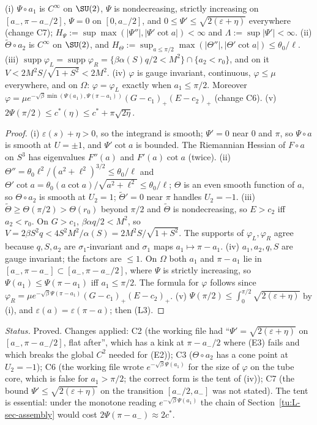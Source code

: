 \begin{lemma}\label{tu:L-ansatz-props}
(i) $\Psi\circ a_1$ is $C^\infty$ on $\SU(2)$, $\Psi$ is nondecreasing, strictly increasing on
$[a_-,\pi-a_-/2]$, $\Psi=0$ on $[0,a_-/2]$, and $0\le\Psi'\le\sqrt{2(\varepsilon+\eta)}$ everywhere
(change C7); $H_\Psi:=\sup\max(|\Psi''|,|\Psi'\cot a|)<\infty$ and $\Lambda:=\sup|\Psi'|<\infty$.
(ii) $\tilde\Theta\circ a_2$ is $C^\infty$ on $\SU(2)$, and $H_\Theta:=\sup_{a\le\pi/2}\max(|\Theta''|,|\Theta'\cot a|)\le\theta_0/\ell$.
(iii) $\operatorname{supp}\varphi_L=\operatorname{supp}\varphi_R=\{\beta\alpha(S)q/2<M^2\}\cap\{a_2<r_0\}$,
and on it $V<2M^2S/\sqrt{1+S^2}<2M^2$.
(iv) $\varphi$ is gauge invariant, continuous, $\varphi\le\mu$ everywhere, and on $\Omega$:
$\varphi=\varphi_L$ exactly when $a_1\le\pi/2$. Moreover
$\varphi=\mu e^{-\sqrt\beta\min(\Psi(a_1),\Psi(\pi-a_1))}(G-c_1)_+(E-c_2)_+$ (change C6).
(v) $2\Psi(\pi/2)\le c^*(\eta)\le c^*+\pi\sqrt{2\eta}$.
\end{lemma}

\begin{proof}
(i) $\varepsilon(s)+\eta>0$, so the integrand is smooth; $\Psi'=0$ near $0$ and $\pi$, so $\Psi\circ a$
is smooth at $U=\pm1$, and $\Psi'\cot a$ is bounded. The Riemannian Hessian of $F\circ a$ on $S^3$ has
eigenvalues $F''(a)$ and $F'(a)\cot a$ (twice). (ii) $\Theta''=\theta_0\ell^2/(a^2+\ell^2)^{3/2}\le\theta_0/\ell$
and $\Theta'\cot a=\theta_0(a\cot a)/\sqrt{a^2+\ell^2}\le\theta_0/\ell$; $\Theta$ is an even smooth function of $a$, so
$\Theta\circ a_2$ is smooth at $U_2=1$; $\tilde\Theta'=0$ near $\pi$ handles $U_2=-1$.
(iii) $\tilde\Theta\ge\Theta(\pi/2)>\Theta(r_0)$ beyond $\pi/2$ and $\tilde\Theta$ is nondecreasing, so
$E>c_2$ iff $a_2<r_0$. On $G>c_1$, $\beta\alpha q/2<M^2$, so
$V=2\beta S^2q<4S^2M^2/\alpha(S)=2M^2S/\sqrt{1+S^2}$. The supports of $\varphi_L,\varphi_R$ agree
because $q,S,a_2$ are $\sigma_1$-invariant and $\sigma_1$ maps $a_1\mapsto\pi-a_1$.
(iv) $a_1,a_2,q,S$ are gauge invariant; the factors are $\le1$. On $\Omega$ both $a_1$ and $\pi-a_1$
lie in $[a_-,\pi-a_-]\subset[a_-,\pi-a_-/2]$, where $\Psi$ is strictly increasing, so
$\Psi(a_1)\le\Psi(\pi-a_1)$ iff $a_1\le\pi/2$. The formula for $\varphi$ follows since
$\varphi_R=\mu e^{-\sqrt\beta\Psi(\pi-a_1)}(G-c_1)_+(E-c_2)_+$.
(v) $\Psi(\pi/2)\le\int_0^{\pi/2}\sqrt{2(\varepsilon+\eta)}$ by (i), and $\varepsilon(a)=\varepsilon(\pi-a)$;
then (L3).
\end{proof}

\noindent\emph{Status.} Proved. Changes applied: C2 (the working file had ``$\Psi'=\sqrt{2(\varepsilon+\eta)}$
on $[a_-,\pi-a_-/2]$, flat after'', which has a kink at $\pi-a_-/2$ where (E3) fails and which breaks the
global $C^2$ needed for (E2)); C3 ($\Theta\circ a_2$ has a cone point at $U_2=-1$); C6 (the working file
wrote $e^{-\sqrt\beta\Psi(a_1)}$ for the size of $\varphi$ on the tube core, which is false for
$a_1>\pi/2$; the correct form is the tent of (iv)); C7 (the bound $\Psi'\le\sqrt{2(\varepsilon+\eta)}$
on the transition $[a_-/2,a_-]$ was not stated). The tent is essential: under the monotone reading
$e^{-\sqrt\beta\Psi(a_1)}$ the chain of Section~\ref{tu:L-sec-assembly} would cost $2\Psi(\pi-a_-)\approx2c^*$.

